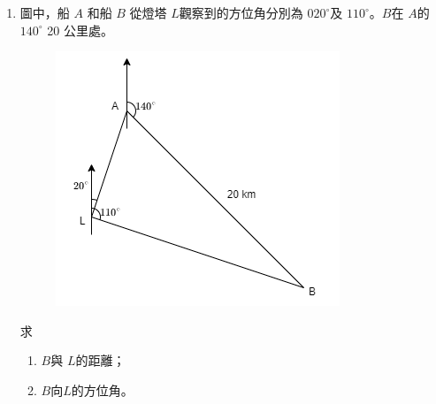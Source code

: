 \documentclass[11pt]{article}
\begin{document}
\begin{enumerate}
    \pagebreak
    \item 圖中，船 $A$ 和船 $B$ 從燈塔 $L$觀察到的方位角分別為 $020^\circ$及 $110^\circ$。$B$在 $A$的$140^\circ$ 20 公里處。\begin{figure}[H]
        \centering
        \includegraphics[scale=0.6]{f4finalq37.png}
    \end{figure}求 \begin{enumerate}
        \item $B$與 $L$的距離；
        \item $B$向$L$的方位角。
    \end{enumerate}

    \hrulefill

        \hrulefill
            
        \hrulefill
        
        \hrulefill
        
        \hrulefill
        
        \hrulefill
        
        \hrulefill
        
        \hrulefill
        
        \hrulefill
        
        \hrulefill
        
        \hrulefill
        
        \hrulefill

        \hrulefill

        \hrulefill
            
        \hrulefill
        
        \hrulefill
        
        \hrulefill
        
        \hrulefill
        

\end{enumerate}
\end{document}
